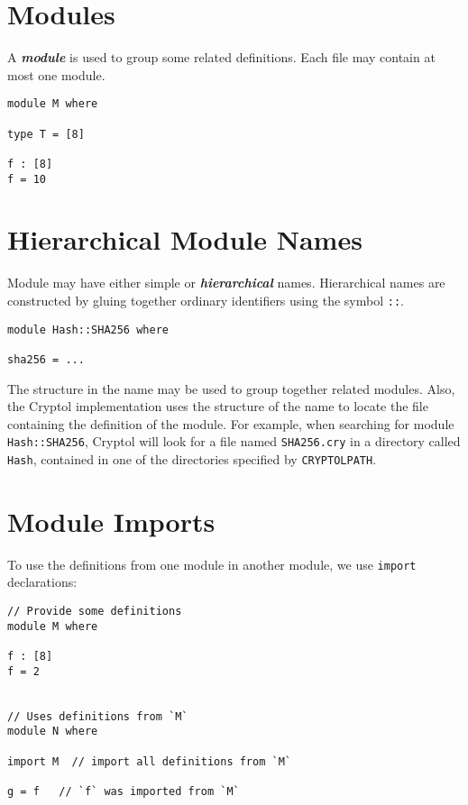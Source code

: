 \hypertarget{modules}{%
\section{Modules}\label{modules}}

A \textbf{\emph{module}} is used to group some related definitions. Each
file may contain at most one module.

\begin{verbatim}
module M where

type T = [8]

f : [8]
f = 10
\end{verbatim}

\hypertarget{hierarchical-module-names}{%
\section{Hierarchical Module Names}\label{hierarchical-module-names}}

Module may have either simple or \textbf{\emph{hierarchical}} names.
Hierarchical names are constructed by gluing together ordinary
identifiers using the symbol \texttt{::}.

\begin{verbatim}
module Hash::SHA256 where

sha256 = ...
\end{verbatim}

The structure in the name may be used to group together related modules.
Also, the Cryptol implementation uses the structure of the name to
locate the file containing the definition of the module. For example,
when searching for module \texttt{Hash::SHA256}, Cryptol will look for a
file named \texttt{SHA256.cry} in a directory called \texttt{Hash},
contained in one of the directories specified by \texttt{CRYPTOLPATH}.

\hypertarget{module-imports}{%
\section{Module Imports}\label{module-imports}}

To use the definitions from one module in another module, we use
\texttt{import} declarations:

\begin{verbatim}
// Provide some definitions
module M where

f : [8]
f = 2


// Uses definitions from `M`
module N where

import M  // import all definitions from `M`

g = f   // `f` was imported from `M`
\end{verbatim}

